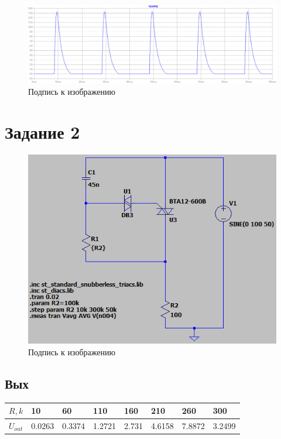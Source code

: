 \documentclass[a4paper, 12pt]{article}
\begin{document}
    \begin{figure}[H]
        \centering
        \includegraphics[scale=0.45]{a150_L20m_D.png}
        \captionsetup{skip=0pt}
        \caption{Подпись к изображению}
        \label{fig:a150_L20m_D}
    \end{figure}


    \section{Задание 2}
    \begin{figure}[H]
        \centering
        \includegraphics[scale=0.8]{scheme4.png}
        \captionsetup{skip=0pt}
        \caption{Подпись к изображению}
        \label{fig:scheme4}
    \end{figure}


    \subsection{Вых}
    \begin{center}
        \begin{tabular}{ | m{4em} | m{1.5cm}| m{1.5cm} | m{1.5cm} | m{1.5cm} | m{1.5cm} | m{1.5cm} | m{1.5cm} | } 
        \hline
        $R,k$& 10 & 60 & 110 &160 &210 &260 &300 \\ 
        \hline
        $U_{out}$& 0.0263 & 0.3374 & 1.2721 &2.731 &4.6158 &7.8872 &3.2499\\ 
        \hline
    \end{tabular}
    \end{center}
\end{document}
